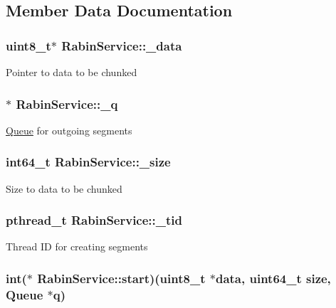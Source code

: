 \subsection{\-Member \-Data \-Documentation}
\hypertarget{structRabinService_a8461bfb056954f3c45eeda80cdd4ec7f}{
\subsubsection[{\-\_\-data}]{\setlength{\rightskip}{0pt plus 5cm}uint8\-\_\-t$\ast$ {\bf \-Rabin\-Service\-::\-\_\-data}}}\label{structRabinService_a8461bfb056954f3c45eeda80cdd4ec7f}
\-Pointer to data to be chunked \hypertarget{structRabinService_ad02102e806e0773c7ff5beb9f75452ca}{
\subsubsection[{\-\_\-q}]{$\ast$ {\bf \-Rabin\-Service\-::\-\_\-q}}}\label{structRabinService_ad02102e806e0773c7ff5beb9f75452ca}
\hyperlink{structQueue}{\-Queue} for outgoing segments \hypertarget{structRabinService_afc0cd3b9bc9cd0f91d144476c26202f6}{
\subsubsection[{\-\_\-size}]{\setlength{\rightskip}{0pt plus 5cm}int64\-\_\-t {\bf \-Rabin\-Service\-::\-\_\-size}}}\label{structRabinService_afc0cd3b9bc9cd0f91d144476c26202f6}
\-Size to data to be chunked \hypertarget{structRabinService_a503127d266fce1634e76b35a21c9a765}{
\subsubsection[{\-\_\-tid}]{\setlength{\rightskip}{0pt plus 5cm}pthread\-\_\-t {\bf \-Rabin\-Service\-::\-\_\-tid}}}\label{structRabinService_a503127d266fce1634e76b35a21c9a765}
\-Thread \-I\-D for creating segments \hypertarget{structRabinService_ae6676668dc7b26b63e977f4958642f02}{
\subsubsection[{start}]{\setlength{\rightskip}{0pt plus 5cm}int($\ast$ {\bf \-Rabin\-Service\-::start})(uint8\-\_\-t $\ast$data, uint64\-\_\-t size, {\bf \-Queue} $\ast$q)}}\label{structRabinService_ae6676668dc7b26b63e977f4958642f02}
